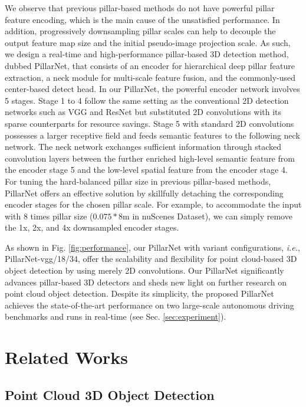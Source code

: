 \documentclass[runningheads]{llncs}
\begin{document}
We observe that previous pillar-based methods do not have powerful pillar feature encoding, which is the main cause of the unsatisfied performance. In addition, progressively downsampling pillar scales can help to decouple the output feature map size and the initial pseudo-image projection scale.
As such, we design a real-time and high-performance pillar-based 3D detection method, dubbed PillarNet, that consists of an encoder for hierarchical deep pillar feature extraction, a neck module for multi-scale feature fusion, and the commonly-used center-based detect head.
In our PillarNet, the powerful encoder network involves 5 stages. Stage 1 to 4 follow the same setting as the conventional 2D detection networks such as VGG \cite{simonyan2014very} and ResNet \cite{he2016deep} but substituted 2D convolutions with its sparse counterparts for resource savings. Stage 5 with standard 2D convolutions possesses a larger receptive field and feeds semantic features to the following neck network.
The neck network exchanges sufficient information through stacked convolution layers between the further enriched high-level semantic feature from the encoder stage 5 and the low-level spatial feature from the encoder stage 4.
For tuning the hard-balanced pillar size in previous pillar-based methods, PillarNet offers an effective solution by skillfully detaching the corresponding encoder stages for the chosen pillar scale. For example, to accommodate the input with 8 times pillar size ($0.075*8$m in nuScenes Dataset), we can simply remove the 1x, 2x, and 4x downsampled encoder stages.

As shown in Fig. \ref{fig:performance}, our PillarNet with variant configurations, \textit{i.e.}, PillarNet-vgg/18/34, offer the scalability and flexibility for point cloud-based 3D object detection by using merely 2D convolutions.
Our PillarNet significantly advances pillar-based 3D detectors and sheds new light on further research on point cloud object detection.
Despite its simplicity, the proposed PillarNet achieves the state-of-the-art performance on two large-scale autonomous driving benchmarks \cite{caesar2020nuscenes,sun2020scalability} and runs in real-time (see Sec. \ref{sec:experiment}). 


\section{Related Works}

\subsection{Point Cloud 3D Object Detection}
\end{document}
